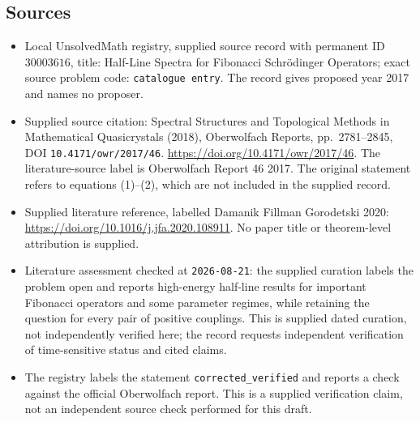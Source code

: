 \documentclass[11pt]{article}
\begin{document}
\subsection{Sources}
\begin{itemize}
\item Local UnsolvedMath registry, supplied source record with permanent ID \(30003616\), title: Half-Line Spectra for Fibonacci Schrödinger Operators; exact source problem code: \texttt{catalogue entry}. The record gives proposed year 2017 and names no proposer.
\item Supplied source citation: Spectral Structures and Topological Methods in Mathematical Quasicrystals (2018), Oberwolfach Reports, pp.\ 2781--2845, DOI \texttt{10.4171/owr/2017/46}. \url{https://doi.org/10.4171/owr/2017/46}. The literature-source label is Oberwolfach Report 46 2017. The original statement refers to equations (1)--(2), which are not included in the supplied record.
\item Supplied literature reference, labelled Damanik Fillman Gorodetski 2020: \url{https://doi.org/10.1016/j.jfa.2020.108911}. No paper title or theorem-level attribution is supplied.
\item Literature assessment checked at \texttt{2026-08-21}: the supplied curation labels the problem open and reports high-energy half-line results for important Fibonacci operators and some parameter regimes, while retaining the question for every pair of positive couplings. This is supplied dated curation, not independently verified here; the record requests independent verification of time-sensitive status and cited claims.
\item The registry labels the statement \texttt{corrected\_verified} and reports a check against the official Oberwolfach report. This is a supplied verification claim, not an independent source check performed for this draft.
\end{itemize}
\end{document}
